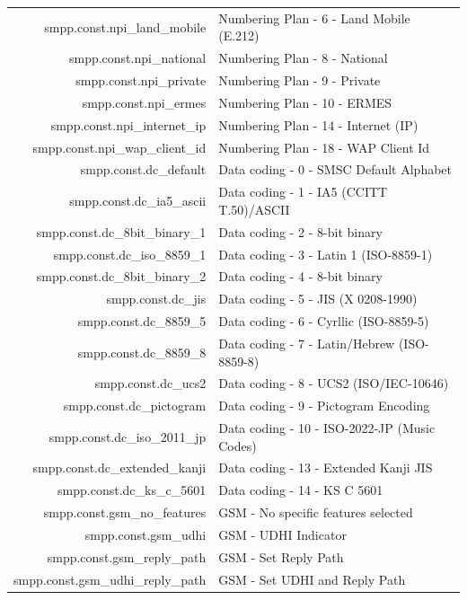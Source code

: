 \documentclass[a4paper,latin]{paper}
\begin{document}
\noindent
\begin{tabularx}{\linewidth}{ | >{\ttfamily} r | >{\ttfamily} X |}
	\hline
	smpp.const.npi\_land\_mobile			& Numbering Plan - 6 - Land Mobile (E.212)\\
	smpp.const.npi\_national			& Numbering Plan - 8 - National\\
	smpp.const.npi\_private				& Numbering Plan - 9 - Private\\
	smpp.const.npi\_ermes				& Numbering Plan - 10 - ERMES\\
	smpp.const.npi\_internet\_ip			& Numbering Plan - 14 - Internet (IP)\\
	smpp.const.npi\_wap\_client\_id			& Numbering Plan - 18 - WAP Client Id\\
	smpp.const.dc\_default				& Data coding - 0 - SMSC Default Alphabet\\
	smpp.const.dc\_ia5\_ascii			& Data coding - 1 - IA5 (CCITT T.50)/ASCII\\
	smpp.const.dc\_8bit\_binary\_1			& Data coding - 2 - 8-bit binary\\
	smpp.const.dc\_iso\_8859\_1			& Data coding - 3 - Latin 1 (ISO-8859-1)\\
	smpp.const.dc\_8bit\_binary\_2			& Data coding - 4 - 8-bit binary\\
	smpp.const.dc\_jis				& Data coding - 5 - JIS (X 0208-1990)\\
	smpp.const.dc\_8859\_5				& Data coding - 6 - Cyrllic (ISO-8859-5)\\
	smpp.const.dc\_8859\_8				& Data coding - 7 - Latin/Hebrew (ISO-8859-8)\\
	smpp.const.dc\_ucs2				& Data coding - 8 - UCS2 (ISO/IEC-10646)\\
	smpp.const.dc\_pictogram			& Data coding - 9 - Pictogram Encoding\\
	smpp.const.dc\_iso\_2011\_jp			& Data coding - 10 - ISO-2022-JP (Music Codes)\\
	smpp.const.dc\_extended\_kanji			& Data coding - 13 - Extended Kanji JIS\\
	smpp.const.dc\_ks\_c\_5601			& Data coding - 14 - KS C 5601\\
	smpp.const.gsm\_no\_features			& GSM - No specific features selected\\
	smpp.const.gsm\_udhi				& GSM - UDHI Indicator\\
	smpp.const.gsm\_reply\_path			& GSM - Set Reply Path\\
	smpp.const.gsm\_udhi\_reply\_path		& GSM - Set UDHI and Reply Path\\

\end{tabularx}
\end{document}

